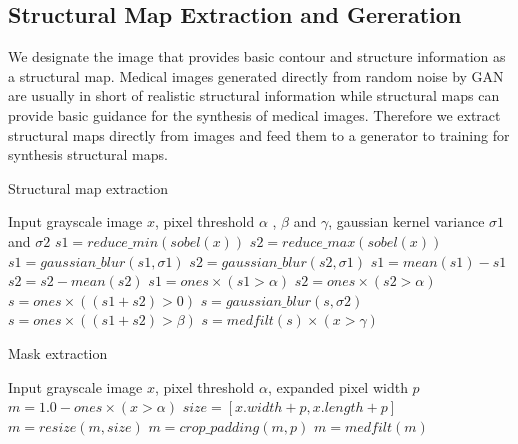\documentclass[runningheads]{llncs}
\begin{document}
	\subsection{Structural Map Extraction and Gereration}
	We designate the image that provides basic contour and structure information as a structural map. Medical images generated directly from random noise by GAN are usually in short of realistic structural information while structural maps can provide basic guidance for the synthesis of medical images. Therefore we extract structural maps directly from images and feed them to a generator to training for synthesis structural maps.
	\vspace{-0.2cm}\begin{algorithm}[th]
		\caption{Structural map extraction}
		\label{alg:1}
		\begin{multicols}{2}
			\begin{algorithmic}[1]
				\State Input grayscale image $x$,
				pixel threshold $\alpha$ , $\beta$ and $\gamma$,
				gaussian kernel variance $\sigma 1$ and $\sigma 2$
				\State $s1 = reduce\_min(sobel(x))$
				\State $s2 = reduce\_max(sobel(x))$
				\State $s1 = gaussian\_blur(s1,\sigma 1)$
				\State $s2 = gaussian\_blur(s2,\sigma 1)$
				\State $s1 = mean(s1) - s1$
				\State $s2 = s2 - mean(s2)$
				\State $s1 = ones \times (s1 > \alpha)$
				\State $s2 = ones \times (s2 > \alpha)$
				\State $s = ones \times ((s1 + s2)> 0)$
				\State $s = gaussian\_blur(s,\sigma 2)$
				\State $s = ones \times ((s1 + s2)> \beta)$
				\State $s = medfilt(s)\times (x > \gamma)$
			\end{algorithmic} 
		\end{multicols}
		\vspace{-0.3cm}
	\end{algorithm}\vspace{-0.5cm}
	\vspace{-0.5cm}\begin{algorithm}[th]
		\caption{Mask extraction}
		\label{alg:2}
		\setstretch{0.8}
		\begin{multicols}{2}
			\begin{algorithmic}[1]
				\State Input grayscale image $x$, pixel threshold $\alpha$, expanded pixel width $p$
				\State $m = 1.0 - ones \times (x > \alpha)$
				\State $size=[x.width+p, x.length+p]$
				\State $m = resize(m, size)$
				\State $m = crop\_padding(m,p)$
				\State $m = medfilt(m)$
			\end{algorithmic} 
		\end{multicols}
		\vspace{-0.3cm}
	\end{algorithm}\vspace{-0.9cm}
\end{document}
